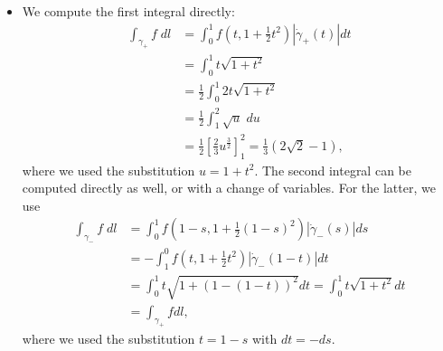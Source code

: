 \documentclass[11pt]{article}
\begin{document}
\begin{solution}
    \begin{itemize}
     \item We compute the first integral directly:
     \begin{align}
        \int_{\gamma_+} f \;dl
        &=
        \int_{0}^1 f( t, 1 + \frac 1 2 t^2 ) |\dot{\gamma}_+(t)|dt
        \\&
        =
        \int_{0}^1 t \sqrt{ 1 + t^2 }
        \\&
        =
        \frac 1 2 \int_{0}^1 2t \sqrt{ 1 + t^2 }
        \\&
        =
        \frac 1 2 \int_1^2 \sqrt{ u } \;du\\&
        =
        \frac 1 2 \left[ \frac 2 3 u^{\frac 3 2} \right]_1^2 = \frac 1 3 \left( 2 \sqrt{2} - 1 \right),
     \end{align}
     where we used the substitution $u = 1 + t^2$.
     The second integral can be computed directly as well, or with a change of variables. For the latter, we use
     \begin{align}
        \int_{\gamma_-} f \;dl
        &=
        \int_{0}^1 f( 1 - s, 1 + \frac 1 2 (1 - s)^2 ) |\dot{\gamma}_-(s)|ds
        \\&
        =-\int_1^0 f(t, 1 + \frac 1 2 t^2) |\dot{\gamma}_-(1-t)|dt
        \\&
        = \int_0^1 t \sqrt{1 + (1 - (1 - t))^2} dt = \int_0^1 t \sqrt{1 + t^2} dt
        \\&
        = \int_{\gamma_+}f dl,
     \end{align}
     where we used the substitution $t = 1 - s$ with $dt = -ds$.


\end{itemize}
\end{solution}
\end{document}
